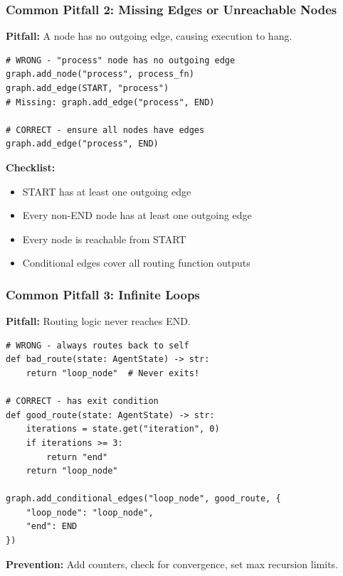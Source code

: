 \documentclass[aspectratio=169,11pt]{beamer}
\begin{document}
\begin{frame}[fragile]
\frametitle{Common Pitfall 2: Missing Edges or Unreachable Nodes}
\textbf{Pitfall:} A node has no outgoing edge, causing execution to hang.

\vspace{10pt}
\begin{lstlisting}
# WRONG - "process" node has no outgoing edge
graph.add_node("process", process_fn)
graph.add_edge(START, "process")
# Missing: graph.add_edge("process", END)

# CORRECT - ensure all nodes have edges
graph.add_edge("process", END)
\end{lstlisting}

\vspace{10pt}
\textbf{Checklist:}
\begin{itemize}
    \setlength{\itemsep}{1pt}
  \item START has at least one outgoing edge
  \item Every non-END node has at least one outgoing edge
  \item Every node is reachable from START
  \item Conditional edges cover all routing function outputs
\end{itemize}
\end{frame}

\begin{frame}[fragile]
\frametitle{Common Pitfall 3: Infinite Loops}
\textbf{Pitfall:} Routing logic never reaches END.

\vspace{10pt}
\begin{lstlisting}
# WRONG - always routes back to self
def bad_route(state: AgentState) -> str:
    return "loop_node"  # Never exits!

# CORRECT - has exit condition
def good_route(state: AgentState) -> str:
    iterations = state.get("iteration", 0)
    if iterations >= 3:
        return "end"
    return "loop_node"

graph.add_conditional_edges("loop_node", good_route, {
    "loop_node": "loop_node",
    "end": END
})
\end{lstlisting}

\vspace{10pt}
\textbf{Prevention:} Add counters, check for convergence, set max recursion limits.
\end{frame}
\end{document}
